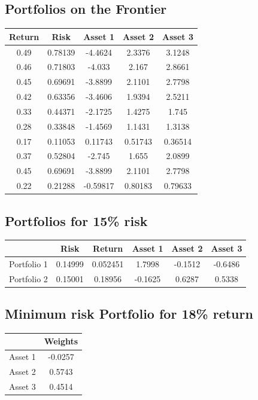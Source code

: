 \documentclass[12pt]{article}
\begin{document}
  \subsection*{Portfolios on the Frontier}
  \begin{center}
  \begin{tabular}{|c|c|c|c|c|}
    Return &Risk &Asset 1 &Asset 2 &Asset 3 \\ \hline \hline
    0.49 &0.78139 &-4.4624 &2.3376 &3.1248\\
    0.46 &0.71803 &-4.033 &2.167 &2.8661\\
    0.45 &0.69691 &-3.8899 &2.1101 &2.7798\\
    0.42 &0.63356 &-3.4606 &1.9394 &2.5211\\
    0.33 &0.44371 &-2.1725 &1.4275 &1.745\\
    0.28 &0.33848 &-1.4569 &1.1431 &1.3138\\
    0.17 &0.11053 &0.11743 &0.51743 &0.36514\\
    0.37 &0.52804 &-2.745 &1.655 &2.0899\\
    0.45 &0.69691 &-3.8899 &2.1101 &2.7798\\
    0.22 &0.21288 &-0.59817 &0.80183 &0.79633\\ \hline
  \end{tabular}
  \end{center}
  
  \subsection*{Portfolios for 15\% risk}
  \begin{center}
  \begin{tabular}{c|c|c|c|c|c|}
    &Risk &Return &Asset 1 &Asset 2 &Asset 3 \\ \hline \hline
  Portfolio 1 &0.14999   &0.052451    &1.7998   &-0.1512   &-0.6486 \\ \hline
  Portfolio 2 &0.15001   &0.18956   &-0.1625    &0.6287    &0.5338 \\
  \hline
  \end{tabular}
  \end{center}
  
  \subsection*{Minimum risk Portfolio for 18\% return}
  \begin{center}
  \begin{tabular}{c|c}
    &Weights \\ \hline \hline
  Asset 1   &-0.0257\\ \hline
  Asset 2   &0.5743\\ \hline
  Asset 3   &0.4514 \\ \hline
  \end{tabular}
  \end{center}
  
\end{document}
